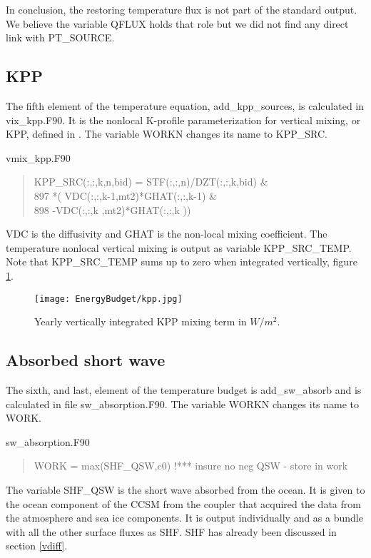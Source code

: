 \begin{appendices}
In conclusion, the restoring temperature flux is not part of the standard output. We believe the variable QFLUX holds that role but we did not find any direct link with PT\_SOURCE.

\subsection{KPP}

The fifth element of the temperature equation, add\_kpp\_sources, is calculated in vix\_kpp.F90. It is the nonlocal K-profile parameterization for vertical mixing, or KPP, defined in \cite{ROG:ROG1432}. The variable WORKN changes its name to KPP\_SRC.
\begin{center} vmix\_kpp.F90 \end{center}
\begin{quotation}
\small
\linespread{0.5}\selectfont{} \hspace{1em}            KPP\_SRC(:,:,k,n,bid) = STF(:,:,n)/DZT(:,:,k,bid)         \&\\
897     \hspace{1em}                            *( VDC(:,:,k-1,mt2)*GHAT(:,:,k-1)   \&\\
898    \hspace{1em}                               -VDC(:,:,k  ,mt2)*GHAT(:,:,k  ))\\
\end{quotation}
VDC is the diffusivity and GHAT is the non-local mixing coefficient. The temperature nonlocal vertical mixing is output as variable KPP\_SRC\_TEMP. Note that KPP\_SRC\_TEMP sums up to zero when integrated vertically, figure \ref{kpp}. 

\begin{figure}
\center
\texttt{[image: EnergyBudget/kpp.jpg]}
\caption{Yearly vertically integrated KPP mixing term in $W/m^2$.}
\label{kpp}
\end{figure}


\subsection{Absorbed short wave}

The sixth, and last, element of the temperature budget is add\_sw\_absorb and is calculated in file sw\_absorption.F90. The variable WORKN changes its name to WORK. 
\begin{center} sw\_absorption.F90 \end{center}
\begin{quotation}
\small
\linespread{0.5}\selectfont{} \hspace{1em}     WORK = max(SHF\_QSW,c0) !*** insure no neg QSW - store in work\\
\end{quotation}
\noindent The variable SHF\_QSW is the short wave absorbed from the ocean. It is given to the ocean component of the CCSM from the coupler that acquired the data from the atmosphere and sea ice components. It is output individually and as a bundle with all the other surface fluxes as SHF. SHF has already been discussed in section \ref{vdiff}.


\end{appendices}
